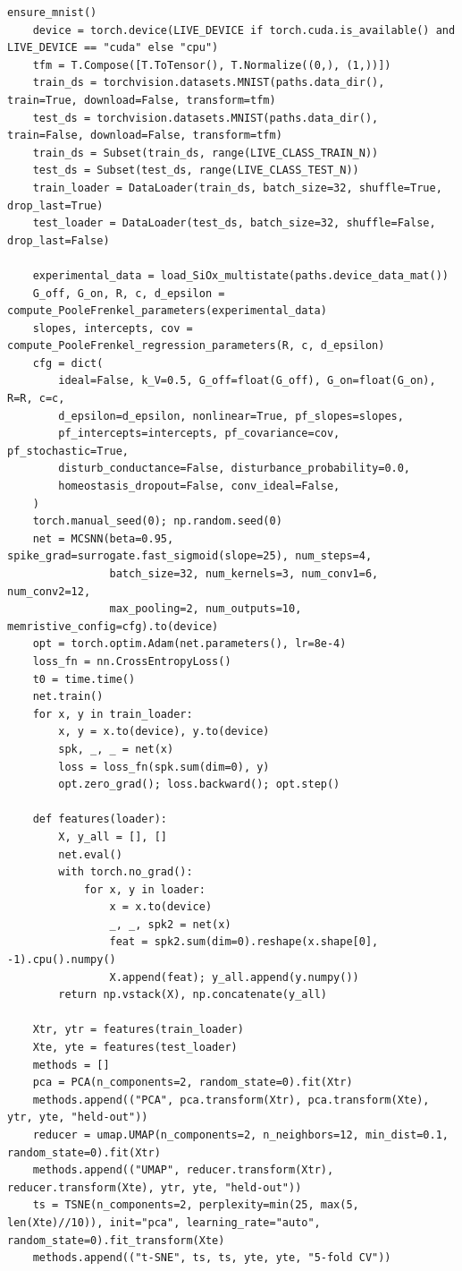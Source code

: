 \begin{lstlisting}[caption={experiments/temporal\_storerecall.ipynb},label={lst:mnn-nb-temporal-storerecall}]
    ensure_mnist()
    device = torch.device(LIVE_DEVICE if torch.cuda.is_available() and LIVE_DEVICE == "cuda" else "cpu")
    tfm = T.Compose([T.ToTensor(), T.Normalize((0,), (1,))])
    train_ds = torchvision.datasets.MNIST(paths.data_dir(), train=True, download=False, transform=tfm)
    test_ds = torchvision.datasets.MNIST(paths.data_dir(), train=False, download=False, transform=tfm)
    train_ds = Subset(train_ds, range(LIVE_CLASS_TRAIN_N))
    test_ds = Subset(test_ds, range(LIVE_CLASS_TEST_N))
    train_loader = DataLoader(train_ds, batch_size=32, shuffle=True, drop_last=True)
    test_loader = DataLoader(test_ds, batch_size=32, shuffle=False, drop_last=False)

    experimental_data = load_SiOx_multistate(paths.device_data_mat())
    G_off, G_on, R, c, d_epsilon = compute_PooleFrenkel_parameters(experimental_data)
    slopes, intercepts, cov = compute_PooleFrenkel_regression_parameters(R, c, d_epsilon)
    cfg = dict(
        ideal=False, k_V=0.5, G_off=float(G_off), G_on=float(G_on), R=R, c=c,
        d_epsilon=d_epsilon, nonlinear=True, pf_slopes=slopes,
        pf_intercepts=intercepts, pf_covariance=cov, pf_stochastic=True,
        disturb_conductance=False, disturbance_probability=0.0,
        homeostasis_dropout=False, conv_ideal=False,
    )
    torch.manual_seed(0); np.random.seed(0)
    net = MCSNN(beta=0.95, spike_grad=surrogate.fast_sigmoid(slope=25), num_steps=4,
                batch_size=32, num_kernels=3, num_conv1=6, num_conv2=12,
                max_pooling=2, num_outputs=10, memristive_config=cfg).to(device)
    opt = torch.optim.Adam(net.parameters(), lr=8e-4)
    loss_fn = nn.CrossEntropyLoss()
    t0 = time.time()
    net.train()
    for x, y in train_loader:
        x, y = x.to(device), y.to(device)
        spk, _, _ = net(x)
        loss = loss_fn(spk.sum(dim=0), y)
        opt.zero_grad(); loss.backward(); opt.step()

    def features(loader):
        X, y_all = [], []
        net.eval()
        with torch.no_grad():
            for x, y in loader:
                x = x.to(device)
                _, _, spk2 = net(x)
                feat = spk2.sum(dim=0).reshape(x.shape[0], -1).cpu().numpy()
                X.append(feat); y_all.append(y.numpy())
        return np.vstack(X), np.concatenate(y_all)

    Xtr, ytr = features(train_loader)
    Xte, yte = features(test_loader)
    methods = []
    pca = PCA(n_components=2, random_state=0).fit(Xtr)
    methods.append(("PCA", pca.transform(Xtr), pca.transform(Xte), ytr, yte, "held-out"))
    reducer = umap.UMAP(n_components=2, n_neighbors=12, min_dist=0.1, random_state=0).fit(Xtr)
    methods.append(("UMAP", reducer.transform(Xtr), reducer.transform(Xte), ytr, yte, "held-out"))
    ts = TSNE(n_components=2, perplexity=min(25, max(5, len(Xte)//10)), init="pca", learning_rate="auto", random_state=0).fit_transform(Xte)
    methods.append(("t-SNE", ts, ts, yte, yte, "5-fold CV"))


\end{lstlisting}
